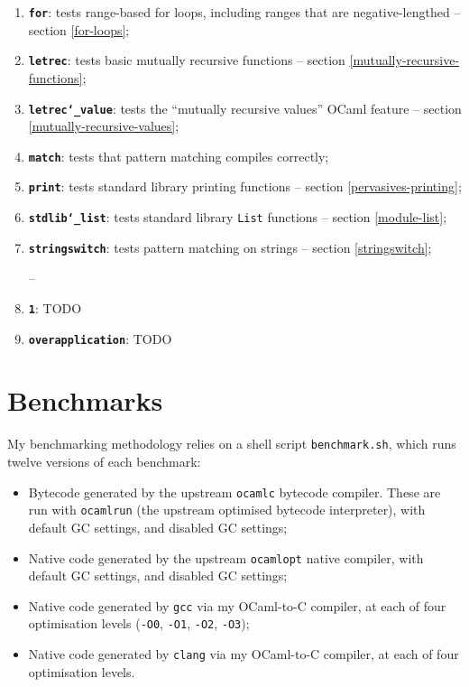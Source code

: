 \documentclass[12pt,a4paper,twoside,openright]{report}
\begin{document}
\begin{enumerate}
    \item \textbf{\texttt{for}}: tests range-based for loops, including ranges
        that are negative-lengthed -- section \ref{for-loops};
    \item \textbf{\texttt{letrec}}: tests basic mutually recursive functions --
        section \ref{mutually-recursive-functions};
    \item \textbf{\texttt{letrec\char`_value}}: tests the ``mutually recursive
        values'' OCaml feature -- section \ref{mutually-recursive-values};
    \item \textbf{\texttt{match}}: tests that pattern matching compiles
        correctly;
    \item \textbf{\texttt{print}}: tests standard library printing functions --
        section \ref{pervasives-printing};
    \item \textbf{\texttt{stdlib\char`_list}}: tests standard library
        \lstinline!List! functions -- section \ref{module-list};
    \item \textbf{\texttt{stringswitch}}: tests pattern matching on strings --
        section \ref{stringswitch};

--

    \item \textbf{\texttt{1}}: TODO
    \item \textbf{\texttt{overapplication}}: TODO
\end{enumerate}

\section{Benchmarks}\label{benchmarks}

My benchmarking methodology relies on a shell script \lstinline!benchmark.sh!,
which runs twelve versions of each benchmark:
\begin{itemize}
    \item Bytecode generated by the upstream \lstinline!ocamlc! bytecode compiler. These are run with \lstinline!ocamlrun! (the upstream optimised bytecode interpreter), with default GC settings, and disabled GC settings;
    \item Native code generated by the upstream \lstinline!ocamlopt! native compiler, with default GC settings, and disabled GC settings;
    \item Native code generated by \lstinline!gcc! via my OCaml-to-C compiler, at each of four optimisation levels (\lstinline!-O0!, \lstinline!-O1!, \lstinline!-O2!, \lstinline!-O3!);
    \item Native code generated by \lstinline!clang! via my OCaml-to-C compiler, at each of four optimisation levels.
\end{itemize}
\end{document}
